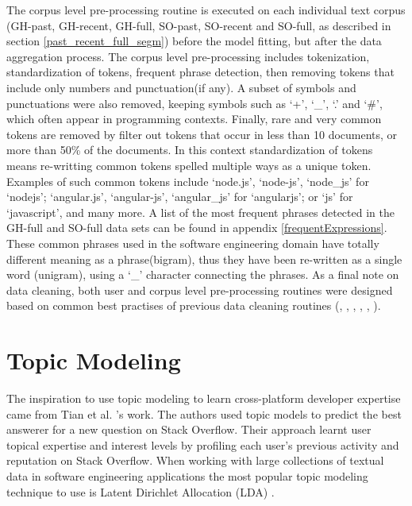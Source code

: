         The corpus level pre-processing routine is executed on each individual text corpus (GH-past, GH-recent, GH-full, SO-past, SO-recent and SO-full, as described in section \ref{past_recent_full_segm}) before the model fitting, but after the data aggregation process. The corpus level pre-processing includes tokenization, standardization of tokens, frequent phrase detection, then removing tokens that include only numbers and punctuation(if any). A subset of symbols and punctuations were also removed, keeping symbols such as ‘+’, ‘\_’, ‘.’ and ‘\#’, which often appear in programming contexts. Finally, rare and very common tokens are removed by filter out tokens that occur in less than 10 documents, or more than 50\% of the documents. In this context standardization of tokens means re-writting common tokens spelled multiple ways as a unique token. Examples of such common tokens include ‘node.js’, ‘node-js’, ‘node\_js’ for ‘nodejs’; ‘angular.js’, ‘angular-js’, ‘angular\_js’ for ‘angularjs’; or ‘js’ for ‘javascript’, and many more. A list of the most frequent phrases detected in the GH-full and SO-full data sets can be found in appendix \ref{frequentExpressions}. These common phrases used in the software engineering domain have totally different meaning as a phrase(bigram), thus they have been re-written as a single word (unigram), using a ‘\_’ character connecting the phrases. As a final note on data cleaning, both user and corpus level pre-processing routines were designed based on common best practises of previous data cleaning routines (\cite{tian2013predicting}, \cite{campbell2015latent}, \cite{treude2019predicting}, \cite{efstathiou2018word}, \cite{boyd2014care}, \cite{liao2019status}).

\section{Topic Modeling\label{topic_modeling}}

    The inspiration to use topic modeling to learn cross-platform developer expertise came from Tian et al. \cite{tian2013predicting}'s work. The authors used topic models to predict the best answerer for a new question on Stack Overflow. Their approach learnt user topical expertise and interest levels by profiling each user's previous activity and reputation on Stack Overflow. When working with large collections of textual data in software engineering applications the most popular topic modeling technique to use is Latent Dirichlet Allocation (LDA) \cite{campbell2015latent}. 
    
